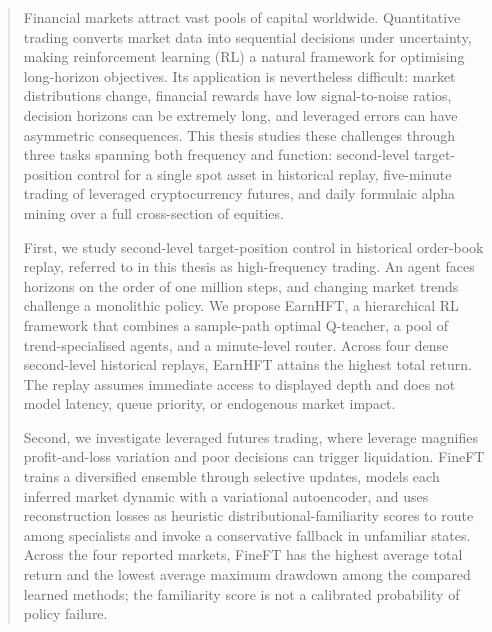 \documentclass[12pt,a4paper]{Thesis} %
\begin{document}

\begin{abstract}


Financial markets attract vast pools of capital worldwide. Quantitative trading converts market data into sequential decisions under uncertainty, making reinforcement learning (RL) a natural framework for optimising long-horizon objectives. Its application is nevertheless difficult: market distributions change, financial rewards have low signal-to-noise ratios, decision horizons can be extremely long, and leveraged errors can have asymmetric consequences. This thesis studies these challenges through three tasks spanning both frequency and function: second-level target-position control for a single spot asset in historical replay, five-minute trading of leveraged cryptocurrency futures, and daily formulaic alpha mining over a full cross-section of equities.

First, we study second-level target-position control in historical order-book replay, referred to in this thesis as high-frequency trading. An agent faces horizons on the order of one million steps, and changing market trends challenge a monolithic policy. We propose EarnHFT, a hierarchical RL framework that combines a sample-path optimal Q-teacher, a pool of trend-specialised agents, and a minute-level router. Across four dense second-level historical replays, EarnHFT attains the highest total return. The replay assumes immediate access to displayed depth and does not model latency, queue priority, or endogenous market impact.

Second, we investigate leveraged futures trading, where leverage magnifies profit-and-loss variation and poor decisions can trigger liquidation. FineFT trains a diversified ensemble through selective updates, models each inferred market dynamic with a variational autoencoder, and uses reconstruction losses as heuristic distributional-familiarity scores to route among specialists and invoke a conservative fallback in unfamiliar states. Across the four reported markets, FineFT has the highest average total return and the lowest average maximum drawdown among the compared learned methods; the familiarity score is not a calibrated probability of policy failure.


\end{abstract}
\end{document}

